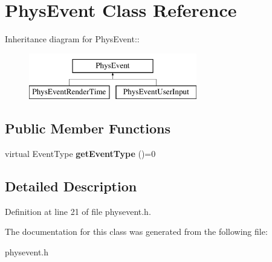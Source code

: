 \hypertarget{classPhysEvent}{
\section{PhysEvent Class Reference}
\label{d9/dc2/classPhysEvent}
}
Inheritance diagram for PhysEvent::\begin{figure}[H]
\begin{center}
\leavevmode
\includegraphics[height=2cm]{d9/dc2/classPhysEvent}
\end{center}
\end{figure}
\subsection*{Public Member Functions}
\begin{DoxyCompactItemize}
\item 
\hypertarget{classPhysEvent_afe21254180cdc4f12913bedcb81b6c6e}{
virtual EventType {\bfseries getEventType} ()=0}
\label{d9/dc2/classPhysEvent_afe21254180cdc4f12913bedcb81b6c6e}

\end{DoxyCompactItemize}


\subsection{Detailed Description}


Definition at line 21 of file physevent.h.

The documentation for this class was generated from the following file:\begin{DoxyCompactItemize}
\item 
physevent.h\end{DoxyCompactItemize}

